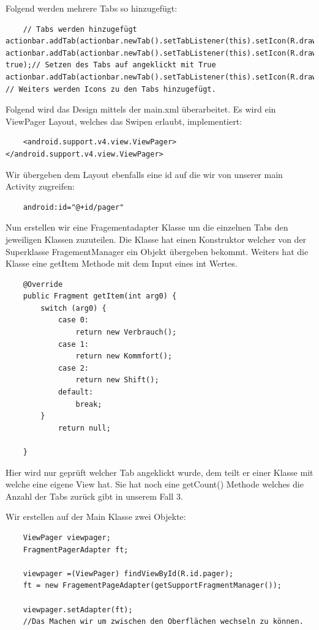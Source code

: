\newline
Folgend werden mehrere Tabs so hinzugefügt:
\begin{lstlisting}
	// Tabs werden hinzugefügt
actionbar.addTab(actionbar.newTab().setTabListener(this).setIcon(R.drawable.verbrauchwolke));
actionbar.addTab(actionbar.newTab().setTabListener(this).setIcon(R.drawable.komfort), true);// Setzen des Tabs auf angeklickt mit True
actionbar.addTab(actionbar.newTab().setTabListener(this).setIcon(R.drawable.schaltvorschlag));
// Weiters werden Icons zu den Tabs hinzugefügt.
\end{lstlisting}

\newline
Folgend wird das Design mittels der main.xml überarbeitet. Es wird ein ViewPager Layout, welches das Swipen erlaubt, implementiert:
\begin{lstlisting}
	<android.support.v4.view.ViewPager> </android.support.v4.view.ViewPager>
\end{lstlisting}
 Wir übergeben dem Layout ebenfalls eine id auf die wir von unserer main Activity zugreifen:
\begin{lstlisting}
	android:id="@+id/pager"
\end{lstlisting} 

\newline
Nun erstellen wir eine Fragementadapter Klasse um die einzelnen Tabs den jeweiligen Klassen zuzuteilen. 
Die Klasse hat einen Konstruktor welcher von der Superklasse FragementManager ein Objekt übergeben bekommt. Weiters hat die Klasse eine getItem Methode mit dem Input eines int Wertes. 
\begin{lstlisting}
	@Override
    public Fragment getItem(int arg0) {
        switch (arg0) {
            case 0:
                return new Verbrauch();
            case 1:
                return new Kommfort();
            case 2:
                return new Shift();
            default:
                break;
        }
            return null;

    }
\end{lstlisting}
Hier wird nur geprüft welcher Tab angeklickt wurde, dem teilt er einer Klasse mit welche eine eigene View hat.
Sie hat noch eine getCount() Methode welches die Anzahl der Tabs zurück gibt in unserem Fall 3.

\newpage
Wir erstellen auf der Main Klasse zwei Objekte:
\begin{lstlisting}
	ViewPager viewpager;
	FragmentPagerAdapter ft;
	
	viewpager =(ViewPager) findViewById(R.id.pager);
	ft = new FragementPageAdapter(getSupportFragmentManager());

	viewpager.setAdapter(ft);
	//Das Machen wir um zwischen den Oberflächen wechseln zu können.
\end{lstlisting}


